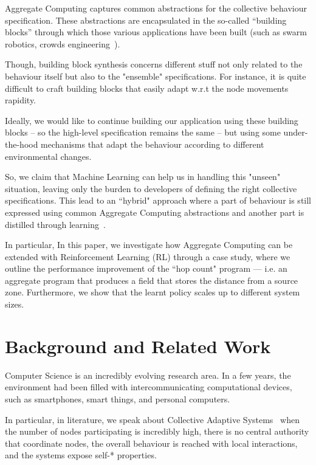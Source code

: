 \documentclass[conference]{IEEEtran}
\newcommand{\todos}[1]{\todo[inline, color=cyan]{\textbf{TODO}: #1}}
\begin{document}
Aggregate Computing captures common abstractions for the collective behaviour specification. 
 These abstractions are encapsulated in the so-called ``building blocks'' through which those various
 applications have been built 
 (such as swarm robotics, crowds engineering~\cite{DBLP:journals/eaai/CasadeiVAPD21}).

Though, building block synthesis concerns different stuff not only related to the behaviour itself
 but also to the "ensemble" specifications. 
 For instance, it is quite difficult to craft building blocks
 that easily adapt w.r.t the node movements rapidity.

Ideally, we would like to continue building our application using these building blocks -- so the high-level specification remains the same -- but using some
 under-the-hood mechanisms that adapt the behaviour according to different environmental changes.
 
So, we claim that Machine Learning can help us in handling this "unseen" situation, leaving only the burden
 to developers of defining the right collective specifications.
%
This lead to an ``hybrid" approach where a part of behaviour is still expressed using common 
 Aggregate Computing abstractions and another part is distilled through learning~\cite{research}.

In particular, In this paper,
 we investigate how Aggregate Computing can be extended with Reinforcement Learning (RL) through a case study,
 where we outline the performance improvement of the ``hop count" program --- 
 i.e. an aggregate program that produces a field that stores the distance from a source zone. 
 Furthermore, we show that the learnt policy scales up to different system sizes.
\todos{Outline}

\section{Background and Related Work}

Computer Science is an incredibly evolving research area. 
 In a few years, the environment had been filled with intercommunicating computational devices, such as smartphones, smart things, and personal computers.

In particular, in literature, we speak about Collective Adaptive Systems~\cite{DBLP:conf/huc/Ferscha15}
 when the number of nodes participating is incredibly high, there is no central authority that coordinate nodes,
 the overall behaviour is reached with local interactions, and the systems expose self-* properties.
 
\end{document}
